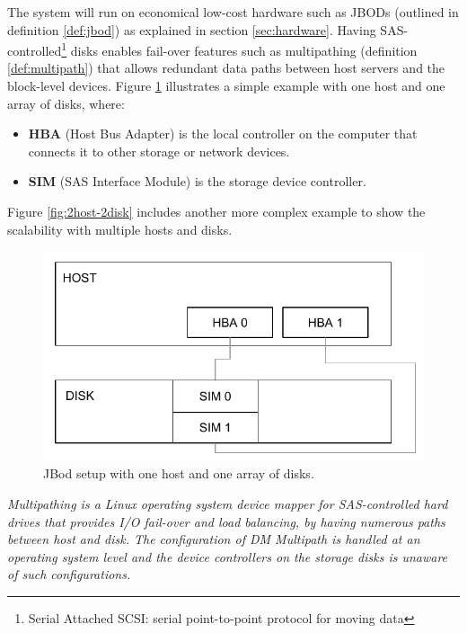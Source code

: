 The system will run on economical low-cost hardware such as JBODs (outlined in definition \ref{def:jbod}) as explained in section \ref{sec:hardware}. Having SAS-controlled\footnote{Serial Attached SCSI: serial point-to-point protocol for moving data} disks enables fail-over features such as multipathing (definition \ref{def:multipath}) that allows redundant data paths between host servers and the block-level devices. Figure \ref{fig:1host-1disk} illustrates a simple example with one host and one array of disks, where:

\begin{itemize}
	\item \textbf{HBA} (Host Bus Adapter) is the local controller on the computer that connects it to other storage or network devices.
	\item \textbf{SIM} (SAS Interface Module) is the storage device controller.
\end{itemize}
\vspace*{3mm}

Figure \ref{fig:2host-2disk} includes another more complex example to show the scalability with multiple hosts and disks.

\begin{figure}[h!]
	\centering
	\includegraphics[scale=0.75]{pdf/1host-1disk.pdf}
	\caption[Simple JBod setup]{JBod setup with one host and one array of disks.\label{fig:1host-1disk}}
\end{figure}

\begin{definition}[DM Multipath] \label{def:multipath}
\textit{Multipathing is a Linux operating system device mapper for SAS-controlled hard drives that provides I/O fail-over and load balancing, by having numerous paths between host and disk. The configuration of DM Multipath is handled at an operating system level and the device controllers on the storage disks is unaware of such configurations.}
\end{definition}

